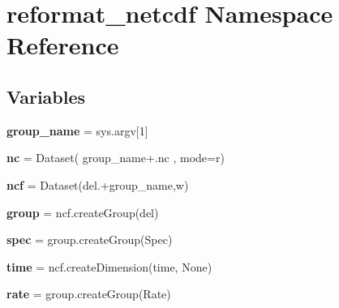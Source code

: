 \hypertarget{namespacereformat__netcdf}{}\section{reformat\+\_\+netcdf Namespace Reference}
\label{namespacereformat__netcdf}
\subsection*{Variables}
\begin{DoxyCompactItemize}
\item 
\mbox{\label{namespacereformat__netcdf_afeba0c3eb4f491e8a327dbb0112fe30b}} 
{\bfseries group\+\_\+name} = sys.\+argv\mbox{[}1\mbox{]}
\item 
\mbox{\label{namespacereformat__netcdf_a48d9843af021a2a7ccda5148faa516d0}} 
{\bfseries nc} = Dataset( group\+\_\+name+\textquotesingle{}.nc\textquotesingle{} , mode=\textquotesingle{}r\textquotesingle{})
\item 
\mbox{\label{namespacereformat__netcdf_a0e1768a556b2fc4e30ca343a8b494ea6}} 
{\bfseries ncf} = Dataset(\textquotesingle{}del.\textquotesingle{}+group\+\_\+name,\textquotesingle{}w\textquotesingle{})
\item 
\mbox{\label{namespacereformat__netcdf_a6fd9863f1602616cf07e4858e1c680fe}} 
{\bfseries group} = ncf.\+create\+Group(\textquotesingle{}del\textquotesingle{})
\item 
\mbox{\label{namespacereformat__netcdf_ae24dda26744d3a79ac5d9eb8ac0d82b4}} 
{\bfseries spec} = group.\+create\+Group(\textquotesingle{}Spec\textquotesingle{})
\item 
\mbox{\label{namespacereformat__netcdf_a1fda7a638a2452eeb4f5a5f38e60f38a}} 
{\bfseries time} = ncf.\+create\+Dimension(\textquotesingle{}time\textquotesingle{}, None)
\item 
\mbox{\label{namespacereformat__netcdf_a56b428e79ee80bb54b71a4b390bcf398}} 
{\bfseries rate} = group.\+create\+Group(\textquotesingle{}Rate\textquotesingle{})

\end{DoxyCompactItemize}
